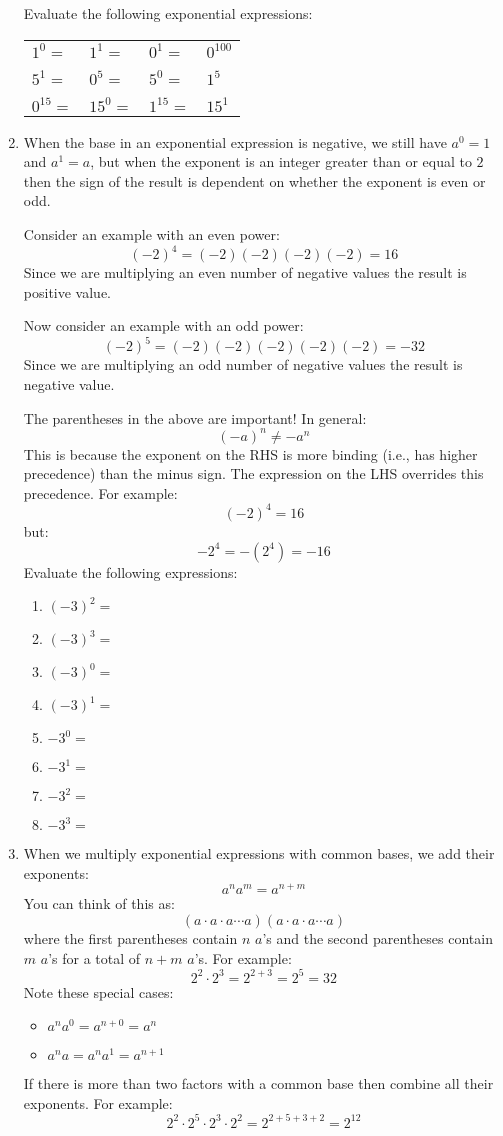 \documentclass[letterpaper,12pt,fleqn]{article}
\begin{document}
\begin{enumerate}
  Evaluate the following exponential expressions: 

  \begin{tabular}{p{1in}p{1in}p{1in}p{1in}}
    $1^0=$ & $1^1=$ & $0^1=$ & $0^{100}$ \\
    \\
    $5^1=$ & $0^5=$ & $5^0=$ & $1^5$ \\
    \\
    $0^{15}=$ & $15^0=$ & $1^{15}=$ & $15^1$
  \end{tabular}

\item When the base in an exponential expression is negative, we still have
  $a^0=1$ and $a^1=a$, but when the exponent is an integer greater than or
  equal to $2$ then the sign of the result is dependent on whether the exponent
  is even or odd.

  Consider an example with an even power:
  \[(−2)^4=(−2)(−2)(−2)(−2)=16\]
  Since we are multiplying an even number of negative values the result is
  positive value.

  Now consider an example with an odd power:
  \[(−2)^5=(−2)(−2)(−2)(−2)(−2)=−32\]
  Since we are multiplying an odd number of negative values the result is
  negative value.

  The parentheses in the above are important! In general:
  \[(-a)^n\ne-a^n\]
  This is because the exponent on the RHS is more binding (i.e., has higher
  precedence) than the minus sign. The expression on the LHS overrides this
  precedence. For example:
  \[(-2)^4=16\]
  but:
  \[-2^4=-(2^4)=-16\]
  Evaluate the following expressions:
  \begin{enumerate}
  \item $(-3)^2=$
  \item $(-3)^3=$
  \item $(-3)^0=$
  \item $(-3)^1=$
  \item $-3^0=$
  \item $-3^1=$
  \item $-3^2=$
  \item $-3^3=$
  \end{enumerate}

\item When we multiply exponential expressions with common bases, we add their
  exponents:
  \[a^na^m=a^{n+m}\]
  You can think of this as:
  \[(a\cdot a\cdot a\cdots a)(a\cdot a\cdot a\cdots a)\]
  where the first parentheses contain $n$ $a$'s and the second parentheses
  contain $m$ $a$'s for a total of $n+m$ $a$'s. For example:
  \[2^2\cdot2^3=2^{2+3}=2^5=32\]
  Note these special cases:
  \begin{itemize}
  \item $a^na^0=a^{n+0}=a^n$
  \item $a^na=a^na^1=a^{n+1}$
  \end{itemize}
  If there is more than two factors with a common base then combine all their
  exponents. For example:
  \[2^2\cdot2^5\cdot2^3\cdot2^2=2^{2+5+3+2}=2^{12}\]


\end{enumerate}
\end{document}
